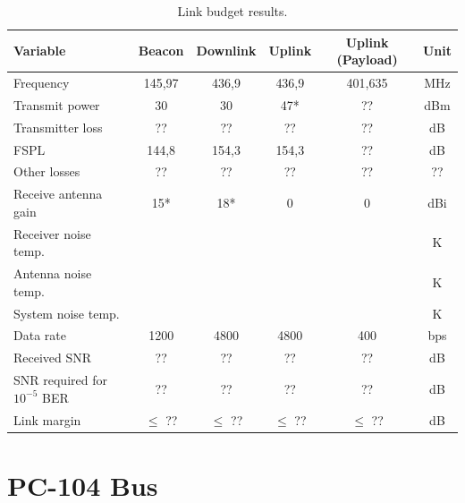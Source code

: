 \begin{table}[!h]
    \centering
    \begin{tabular}{lccccc}
        \toprule[1.5pt]
        \textbf{Variable} & \textbf{Beacon} & \textbf{Downlink} & \textbf{Uplink} & \textbf{Uplink (Payload)} & \textbf{Unit}\\
        \midrule
        Frequency                       & 145,97    & 436,9     & 436,9     & 401,635   & MHz \\
        Transmit power                  & 30        & 30        & 47*       & ??        & dBm \\
        Transmitter loss                & ??        & ??        & ??        & ??        & dB \\
        FSPL                            & 144,8     & 154,3     & 154,3     & ??        & dB \\
        Other losses                    & ??        & ??        & ??        & ??        & ?? \\
        Receive antenna gain            & 15*       & 18*       & 0         & 0         & dBi \\
        Receiver noise temp.            &           &           &           &           & K \\
        Antenna noise temp.             &           &           &           &           & K \\
        System noise temp.              &           &           &           &           & K \\
        Data rate                       & 1200      & 4800      & 4800      & 400       & bps \\
        Received SNR                    & ??        & ??        & ??        & ??        & dB \\
        SNR required for $10^{-5}$ BER  & ??        & ??        & ??        & ??        & dB \\
        Link margin                     & $\leq$ ?? & $\leq$ ?? & $\leq$ ?? & $\leq$ ?? & dB \\
        \bottomrule[1.5pt]
    \end{tabular}
    \caption{Link budget results.}
    \label{tab:link-budget-results}
\end{table}

\section{PC-104 Bus}

